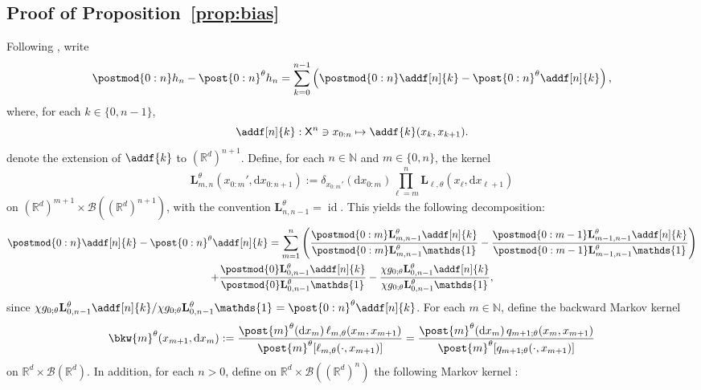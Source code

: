 \documentclass{article}
\newcommand{\uksymbol}{\ell}
\newcommand{\intvect}[2]{\{ #1, #2 \}}
\newcommand{\ud}[1]{\uksymbol_{#1}}
\newcommand{\nset}{\mathbb{N}}
\newcommand{\1}{\mathbbm{1}}
\newcommand{\uk}[1]{\mathbf{L}_{#1}}
\newcommand{\Xset}{\mathsf{X}}
\newcommand{\md}[1]{g_{#1}}
\newcommand{\parvec}{\theta}
\newcommand{\hd}[1]{q_{#1}}
\def\1{\mathds{1}}
\newcommand{\rmd}{\ensuremath{\mathrm{d}}}
\newcommand{\eqdef}{\ensuremath{:=}}
\begin{document}
\subsection{Proof of Proposition~\ref{prop:bias}}
\label{sec:proof}
Following \cite{gloaguen2019pseudo}, write 
$$
\postmod{0:n} h_n - \post{0:n}^\theta h_n = \sum_{k = 0}^{n - 1} \left( \postmod{0:n} \addf[n]{k} - \post{0:n}^\theta \addf[n]{k} \right), 
$$
where, for each $k \in \intvect{0}{n - 1}$, 
\begin{equation} \label{eq:def:addf}
\addf[n]{k} : \Xset^n \ni x_{0:n} \mapsto \addf{k}(x_k, x_{k + 1}) .
\end{equation}
denote the extension of $\addf{k}$ to $(\mathbb{R}^d)^{n+1}$. Define, for each $n \in \nset$ and $m \in \intvect{0}{n}$, the kernel 
\begin{equation} \label{eq:def:uk:products}
    \uk{m, n}^\theta(x_{0:m}', \rmd x_{0:n + 1}) \eqdef \delta_{x_{0:m}'}(\rmd x_{0:m}) \prod_{\ell = m}^n \uk{\ell,\theta}(x_\ell, \rmd x_{\ell + 1}) 
\end{equation}
on $(\mathbb{R}^d)^{m+1} \times \mathcal{B}((\mathbb{R}^d)^{n + 1})$, with the convention $\uk{n, n - 1}^\theta = \operatorname{id}$.  This yields the following decomposition:
\begin{multline*}
\postmod{0:n} \addf[n]{k} - \post{0:n}^\theta \addf[n]{k} = 
\sum_{m = 1}^n \left( \frac{\postmod{0:m} \uk{m, n - 1}^\theta \addf[n]{k}}{\postmod{0:m} \uk{m, n - 1}^\theta \1_{}} - \frac{\postmod{0:m - 1} \uk{m - 1, n - 1}^\theta \addf[n]{k}}{\postmod{0:m - 1} \uk{m - 1, n - 1}^\theta \1_{}} \right) \\ + \frac{\postmod{0} \uk{0, n - 1}^\theta \addf[n]{k}}{\postmod{0} \uk{0, n - 1}^\theta \1_{}} - \frac{\chi \md{0;\parvec}\uk{0, n - 1}^\theta \addf[n]{k}}{\chi\md{0;\parvec}\uk{0, n - 1}^\theta \1_{}},
\end{multline*}
since $\chi \md{0;\parvec} \uk{0, n - 1}^\theta \addf[n]{k}/\chi\md{0;\parvec}\uk{0, n - 1}^\theta \1_{} = \post{0:n}^\theta \addf[n]{k}$.
For each $m \in \nset$, define the  backward Markov kernel 
\begin{equation} \label{eq:def:backward:kernel}
    \bkw{m}^\parvec(x_{m + 1}, \rmd x_m) \eqdef \frac{\post{m}^\parvec(\rmd x_m) \, \ud{m,\parvec}(x_m, x_{m + 1})}{\post{m}^\parvec[\ud{m,\parvec}(\cdot, x_{m + 1})]} = \frac{\post{m}^\parvec(\rmd x_m) \, \hd{m+1;\parvec}(x_{m}, x_{m+1})}{\post{m}^\parvec[\hd{m+1;\parvec}(\cdot, x_{m+1})]}
\end{equation}
on $\mathbb{R}^d \times \mathcal{B}(\mathbb{R}^d)$. In addition, for each $n>0$, define on $\mathbb{R}^d \times \mathcal{B}((\mathbb{R}^d)^n)$ the following Markov kernel  : 
\end{document}
